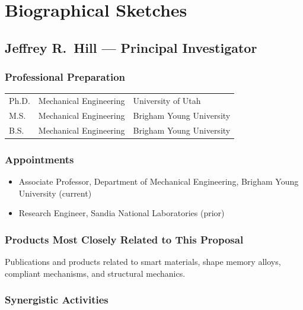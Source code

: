 
\section*{Biographical Sketches}

\subsection*{Jeffrey R.\ Hill --- Principal Investigator}

\subsubsection*{Professional Preparation}

\begin{tabular}{@{}lll@{}}
Ph.D. & Mechanical Engineering & University of Utah \\
M.S.  & Mechanical Engineering & Brigham Young University \\
B.S.  & Mechanical Engineering & Brigham Young University \\
\end{tabular}

\subsubsection*{Appointments}

\begin{itemize}[nosep]
    \item Associate Professor, Department of Mechanical Engineering, Brigham Young University (current)
    \item Research Engineer, Sandia National Laboratories (prior)
\end{itemize}

\subsubsection*{Products Most Closely Related to This Proposal}

Publications and products related to smart materials, shape memory alloys,
compliant mechanisms, and structural mechanics.

\subsubsection*{Synergistic Activities}

